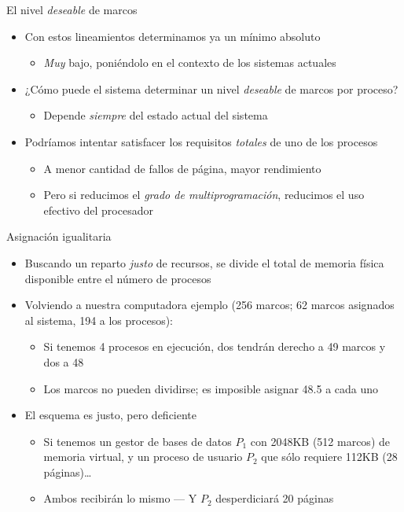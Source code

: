 \documentclass[presentation]{beamer}
\begin{document}
\begin{frame}[label={sec:org639e02c}]{El nivel \emph{deseable} de marcos}
\begin{itemize}
\item Con estos lineamientos determinamos ya un mínimo absoluto
\begin{itemize}
\item \emph{Muy} bajo, poniéndolo en el contexto de los sistemas actuales
\end{itemize}
\item ¿Cómo puede el sistema determinar un nivel \emph{deseable} de marcos por
proceso?
\begin{itemize}
\item Depende \emph{siempre} del estado actual del sistema
\end{itemize}
\item Podríamos intentar satisfacer los requisitos \emph{totales} de uno de
los procesos
\begin{itemize}
\item A menor cantidad de fallos de página, mayor rendimiento
\item Pero si reducimos el \emph{grado de multiprogramación}, reducimos el
uso efectivo del procesador
\end{itemize}
\end{itemize}
\end{frame}

\begin{frame}[label={sec:org4773cb2}]{Asignación igualitaria}
\begin{itemize}
\item Buscando un reparto \emph{justo} de recursos, se divide el total de
memoria física disponible entre el número de procesos
\item Volviendo a nuestra computadora ejemplo (256 marcos; 62 marcos
asignados al sistema, 194 a los procesos):
\begin{itemize}
\item Si tenemos 4 procesos en ejecución, dos tendrán derecho a 49
marcos y dos a 48
\item Los marcos no pueden dividirse; es imposible asignar 48.5 a cada
uno
\end{itemize}
\end{itemize}
\pause
\begin{itemize}
\item El esquema es justo, pero deficiente
\begin{itemize}
\item Si tenemos un gestor de bases de datos \(P_1\) con 2048KB (512
marcos) de memoria virtual, y un proceso de usuario \(P_2\) que sólo
requiere 112KB (28 páginas)\ldots{}
\item Ambos recibirán lo mismo — Y \(P_2\)  desperdiciará 20 páginas
\end{itemize}
\end{itemize}
\end{frame}
\end{document}
